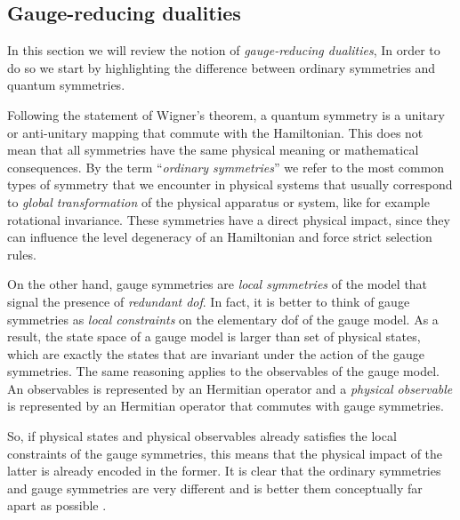 %
%
\subsection{Gauge-reducing dualities}%
\label{sub:gauge_reducing_dualities}

In this section we will review the notion of \emph{gauge-reducing dualities},
In order to do so we start by highlighting the difference between ordinary symmetries and quantum symmetries.

Following the statement of Wigner's theorem\citneeded, a quantum symmetry is a unitary or anti-unitary mapping that commute with the Hamiltonian.
This does not mean that all symmetries have the same physical meaning or mathematical consequences.
By the term ``\emph{ordinary symmetries}'' we refer to the most common types of symmetry that we encounter in physical systems that usually correspond to \emph{global transformation} of the physical apparatus or system, like for example rotational invariance.
These symmetries have a direct physical impact, since they can influence the level degeneracy of an Hamiltonian and force strict selection rules.

On the other hand, gauge symmetries are \emph{local symmetries} of the model that signal the presence of \emph{redundant \ac{dof}}.
In fact, it is better to think of gauge symmetries as \emph{local constraints} on the elementary \ac{dof} of the gauge model.
As a result, the state space of a gauge model is larger than set of physical states, which are exactly the states that are invariant under the action of the gauge symmetries.
The same reasoning applies to the observables of the gauge model.
An observables is represented by an Hermitian operator and a \emph{physical observable} is represented by an Hermitian operator that commutes with gauge symmetries.

So, if physical states and physical observables already satisfies the local constraints of the gauge symmetries, this means that the physical impact of the latter is already encoded in the former.
It is clear that the ordinary symmetries and gauge symmetries are very different and is better them conceptually far apart as possible \cite{cobanera2011bond}.


